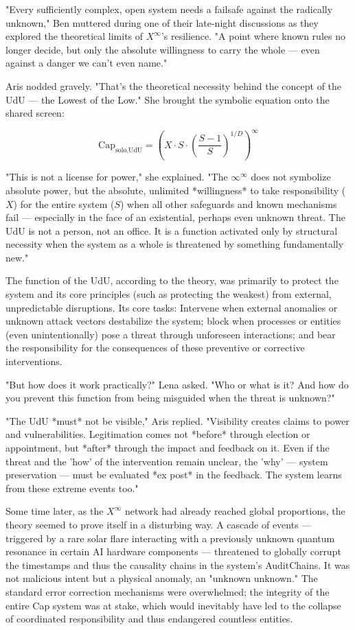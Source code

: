 \documentclass[12pt, english, parskip=full]{scrartcl} %
\begin{document}
"Every sufficiently complex, open system needs a failsafe against the radically unknown," Ben muttered during one of their late-night discussions as they explored the theoretical limits of $X^{\infty}$’s resilience. "A point where known rules no longer decide, but only the absolute willingness to carry the whole — even against a danger we can’t even name."

Aris nodded gravely. "That’s the theoretical necessity behind the concept of the UdU — the Lowest of the Low." She brought the symbolic equation onto the shared screen:

$$ \text{Cap}_{\text{solo,UdU}} = \left( X \cdot S \cdot \left( \frac{S-1}{S} \right)^{1/D} \right)^\infty $$

"This is not a license for power," she explained. "The $\infty^\infty$ does not symbolize absolute power, but the absolute, unlimited *willingness* to take responsibility ($X$) for the entire system ($S$) when all other safeguards and known mechanisms fail — especially in the face of an existential, perhaps even unknown threat. The UdU is not a person, not an office. It is a function activated only by structural necessity when the system as a whole is threatened by something fundamentally new."

The function of the UdU, according to the theory, was primarily to protect the system and its core principles (such as protecting the weakest) from external, unpredictable disruptions. Its core tasks: Intervene when external anomalies or unknown attack vectors destabilize the system; block when processes or entities (even unintentionally) pose a threat through unforeseen interactions; and bear the responsibility for the consequences of these preventive or corrective interventions.

"But how does it work practically?" Lena asked. "Who or what is it? And how do you prevent this function from being misguided when the threat is unknown?"

"The UdU *must* not be visible," Aris replied. "Visibility creates claims to power and vulnerabilities. Legitimation comes not *before* through election or appointment, but *after* through the impact and feedback on it. Even if the threat and the 'how' of the intervention remain unclear, the 'why' — system preservation — must be evaluated *ex post* in the feedback. The system learns from these extreme events too."

Some time later, as the $X^{\infty}$ network had already reached global proportions, the theory seemed to prove itself in a disturbing way. A cascade of events — triggered by a rare solar flare interacting with a previously unknown quantum resonance in certain AI hardware components — threatened to globally corrupt the timestamps and thus the causality chains in the system’s AuditChains. It was not malicious intent but a physical anomaly, an "unknown unknown." The standard error correction mechanisms were overwhelmed; the integrity of the entire Cap system was at stake, which would inevitably have led to the collapse of coordinated responsibility and thus endangered countless entities.
\end{document}
